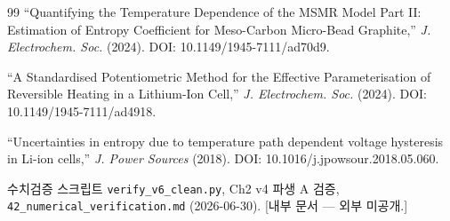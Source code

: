 \documentclass[11pt,a4paper]{article}
\begin{document}
\begin{thebibliography}{99}
``Quantifying the Temperature Dependence of the MSMR Model Part II:
Estimation of Entropy Coefficient for Meso-Carbon Micro-Bead Graphite,''
\emph{J. Electrochem. Soc.} (2024).
DOI: 10.1149/1945-7111/ad70d9.

``A Standardised Potentiometric Method for the Effective Parameterisation of
Reversible Heating in a Lithium-Ion Cell,''
\emph{J. Electrochem. Soc.} (2024).
DOI: 10.1149/1945-7111/ad4918.

``Uncertainties in entropy due to temperature path dependent voltage hysteresis
in Li-ion cells,''
\emph{J. Power Sources} (2018).
DOI: 10.1016/j.jpowsour.2018.05.060.

수치검증 스크립트 \texttt{verify\_v6\_clean.py}, Ch2 v4 파생 A 검증,
\texttt{42\_numerical\_verification.md} (2026-06-30).
[내부 문서 — 외부 미공개.]

\end{thebibliography}
\end{document}
